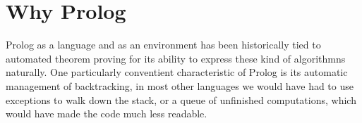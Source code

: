 \documentclass[a4paper, 12pt, english]{report}
\begin{document}
% 





\section{Why Prolog}
Prolog as a language and as an environment has been historically tied to automated theorem proving for its ability to express these kind of algorithmns naturally.
One particularly conventient characteristic of Prolog is its automatic management of backtracking, in most other languages we would have had to use exceptions to walk down the stack, or a queue of unfinished computations, which would have made the code much less readable.
\end{document}
